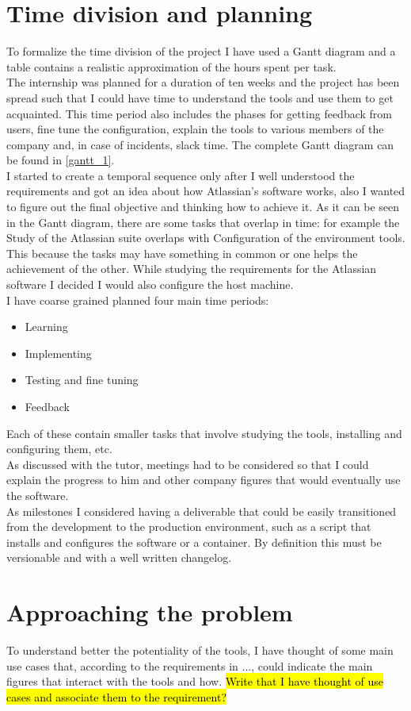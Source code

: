 \section{Time division and planning}
	To formalize the time division of the project I have used a Gantt diagram and a table contains a realistic approximation of the hours spent per task.\\
	The internship was planned for a duration of ten weeks and the project has been spread such that I could have time to understand the tools and use them to get acquainted.
	This time period also includes the phases for getting feedback from users, fine tune the configuration, explain the tools to various members of the company and, in case of incidents, slack time.
	The complete Gantt diagram can be found in \ref{gantt_1}.\\
	I started to create a temporal sequence only after I well understood the requirements and got an idea about how Atlassian's software works, also I wanted to figure out the final objective and thinking how to achieve it.
	As it can be seen in the Gantt diagram, there are some tasks that overlap in time: for example the Study of the Atlassian suite overlaps with Configuration of the environment tools.
	This because the tasks may have something in common or one helps the achievement of the other.
	While studying the requirements for the Atlassian software I decided I would also configure the host machine.\\
	I have coarse grained planned four main time periods:
	\begin{itemize}
		\item Learning
		\item Implementing
		\item Testing and fine tuning
		\item Feedback
	\end{itemize}
	Each of these contain smaller tasks that involve studying the tools, installing and configuring them, etc.\\
	As discussed with the tutor, meetings had to be considered so that I could explain the progress to him and other company figures that would eventually use the software.\\
	As milestones I considered having a deliverable that could be easily transitioned from the development to the production environment, such as a script that installs and configures the software or a container.
	By definition this must be versionable and with a well written changelog.
	
\section{Approaching the problem}
	To understand better the potentiality of the tools, I have thought of some main use cases that, according to the requirements in ..., could indicate the main figures that interact with the tools and how.
	\hl{Write that I have thought of use cases and associate them to the requirement?}

	
	